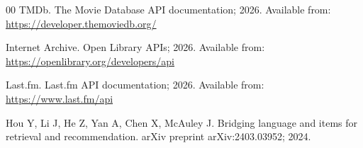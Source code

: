 \documentclass[3p,times,procedia]{elsarticle}
\begin{document}
\begin{thebibliography}{00}
TMDb. The Movie Database API documentation; 2026. Available from: \url{https://developer.themoviedb.org/}

Internet Archive. Open Library APIs; 2026. Available from: \url{https://openlibrary.org/developers/api}

Last.fm. Last.fm API documentation; 2026. Available from: \url{https://www.last.fm/api}

Hou Y, Li J, He Z, Yan A, Chen X, McAuley J. Bridging language and items for retrieval and recommendation. arXiv preprint arXiv:2403.03952; 2024.

\end{thebibliography}
\end{document}
